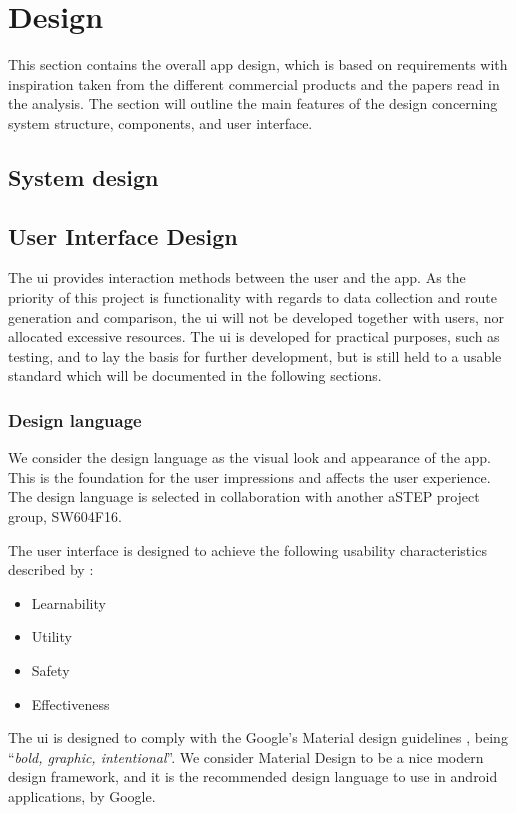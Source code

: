 \section{Design}\label{sprint1design}
This section contains the overall app design, which is based on requirements with inspiration taken from the different commercial products and the papers read in the analysis.
The section will outline the main features of the design concerning system structure, components, and user interface.

\subsection{System design}


\subsection{User Interface Design}
The \gls{ui} provides interaction methods between the user and the app.
As the priority of this project is functionality with regards to data collection and route generation and comparison, the \gls{ui} will not be developed together with users, nor allocated excessive resources. 
The \gls{ui} is developed for practical purposes, such as testing, and to lay the basis for further development, but is still held to a usable standard which will be documented in the following sections. 

\subsubsection{Design language}
We consider the design language as the visual look and appearance of the app.
This is the foundation for the user impressions and affects the user experience.
The design language is selected in collaboration with another aSTEP project group, SW604F16.

The user interface is designed to achieve the following usability characteristics described by \citet{DIS2014}:
\begin{itemize}
	\item Learnability
	\item Utility
	\item Safety
	\item Effectiveness
\end{itemize}

The \gls{ui} is designed to comply with the Google's Material design guidelines \cite{materialDesign}, being ``\textit{bold, graphic, intentional}''. 
We consider Material Design to be a nice modern design framework, and it is the recommended design language to use in android applications, by Google\cite{materialProperties}. 

